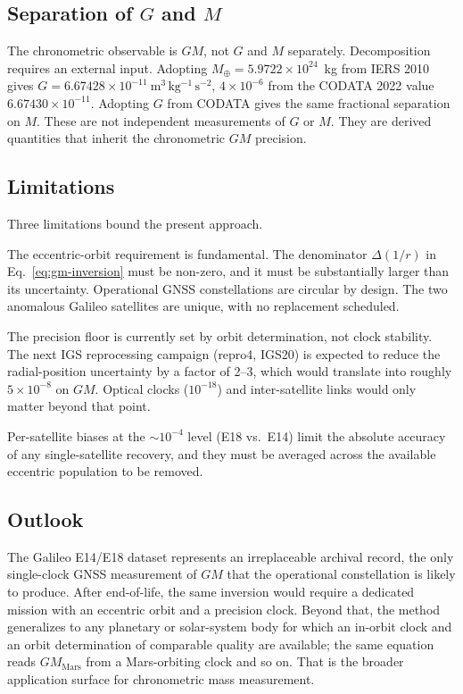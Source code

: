 \documentclass[11pt,a4paper]{article}
\begin{document}
\subsection{Separation of $G$ and $M$}

The chronometric observable is $GM$, not $G$ and $M$ separately. Decomposition requires an external input. Adopting $M_\oplus = 5.9722 \times 10^{24}$~kg from IERS 2010 gives $G = 6.67428 \times 10^{-11}~\mathrm{m^3\,kg^{-1}\,s^{-2}}$, $4 \times 10^{-6}$ from the CODATA 2022 value $6.67430 \times 10^{-11}$. Adopting $G$ from CODATA gives the same fractional separation on $M$. These are not independent measurements of $G$ or $M$. They are derived quantities that inherit the chronometric $GM$ precision.

\subsection{Limitations}

Three limitations bound the present approach.

The eccentric-orbit requirement is fundamental. The denominator $\Delta(1/r)$ in Eq.~\eqref{eq:gm-inversion} must be non-zero, and it must be substantially larger than its uncertainty. Operational GNSS constellations are circular by design. The two anomalous Galileo satellites are unique, with no replacement scheduled.

The precision floor is currently set by orbit determination, not clock stability. The next IGS reprocessing campaign (repro4, IGS20) is expected to reduce the radial-position uncertainty by a factor of 2--3, which would translate into roughly $5 \times 10^{-8}$ on $GM$. Optical clocks ($10^{-18}$) and inter-satellite links would only matter beyond that point.

Per-satellite biases at the $\sim 10^{-4}$ level (E18 vs.\ E14) limit the absolute accuracy of any single-satellite recovery, and they must be averaged across the available eccentric population to be removed.

\subsection{Outlook}

The Galileo E14/E18 dataset represents an irreplaceable archival record, the only single-clock GNSS measurement of $GM$ that the operational constellation is likely to produce. After end-of-life, the same inversion would require a dedicated mission with an eccentric orbit and a precision clock. Beyond that, the method generalizes to any planetary or solar-system body for which an in-orbit clock and an orbit determination of comparable quality are available; the same equation reads $GM_\text{Mars}$ from a Mars-orbiting clock and so on. That is the broader application surface for chronometric mass measurement.
\end{document}
